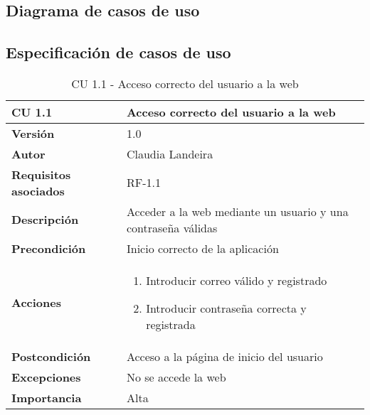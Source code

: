 \newpage
\subsection{Diagrama de casos de uso}

\subsection{Especificación de casos de uso}

\begin{table}[p]
	\centering
	\begin{tabularx}{\linewidth}{ p{} p{} }
		\toprule
		\textbf{CU 1.1}    & \textbf{Acceso correcto del usuario a la web}\\
		\toprule
		\textbf{Versión}              & 1.0    \\
		\textbf{Autor}                & Claudia Landeira \\
		\textbf{Requisitos asociados} & RF-1.1\\
		\textbf{Descripción}          & Acceder a la web mediante un usuario y una contraseña válidas\\
		\textbf{Precondición}         & Inicio correcto de la aplicación \\
		\textbf{Acciones}             &
		\begin{enumerate}
			\def\labelenumi{\arabic{enumi}.}
			\tightlist
			\item Introducir correo válido y registrado
			\item Introducir contraseña correcta y registrada
		\end{enumerate}\\
		\textbf{Postcondición}        & Acceso a la página de inicio del usuario \\
		\textbf{Excepciones}          & No se accede la web \\
		\textbf{Importancia}          & Alta \\
		\bottomrule
	\end{tabularx}
	\caption{CU 1.1 - Acceso correcto del usuario a la web}
\end{table}

